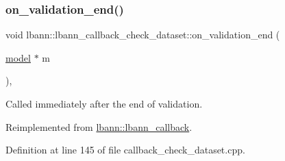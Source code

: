 \subsubsection{\texorpdfstring{on\+\_\+validation\+\_\+end()}{on\_validation\_end()}}
{\footnotesize\ttfamily void lbann\+::lbann\+\_\+callback\+\_\+check\+\_\+dataset\+::on\+\_\+validation\+\_\+end (\begin{DoxyParamCaption}\item[{\hyperlink{classlbann_1_1model}{model} $\ast$}]{m }\end{DoxyParamCaption})\hspace{0.3cm}{\ttfamily [override]}, {\ttfamily [virtual]}}

Called immediately after the end of validation. 

Reimplemented from \hyperlink{classlbann_1_1lbann__callback_adc16e42e5064dc2dc8d84dfbfc1325eb}{lbann\+::lbann\+\_\+callback}.



Definition at line 145 of file callback\+\_\+check\+\_\+dataset.\+cpp.


